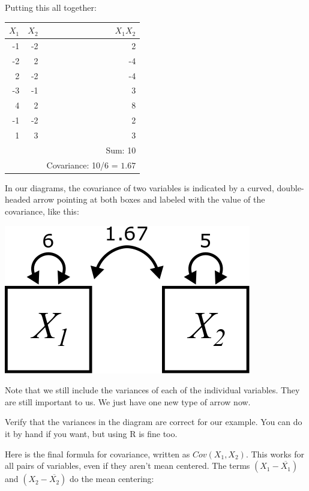 \documentclass[
]{book}
\begin{document}
Putting this all together:

\begin{longtable}[]{@{}rrr@{}}
\toprule
\(X_{1}\) & \(X_{2}\) & \(X_{1}X_{2}\) \\
\midrule
\endhead
-1 & -2 & 2 \\
-2 & 2 & -4 \\
2 & -2 & -4 \\
-3 & -1 & 3 \\
4 & 2 & 8 \\
-1 & -2 & 2 \\
1 & 3 & 3 \\
& & Sum: 10 \\
& & Covariance: 10/6 = \(\boxed{1.67}\) \\
\bottomrule
\end{longtable}

In our diagrams, the covariance of two variables is indicated by a curved, double-headed arrow pointing at both boxes and labeled with the value of the covariance, like this:

\begin{center}\includegraphics{graphics/covariance_labeled} \end{center}

Note that we still include the variances of each of the individual variables. They are still important to us. We just have one new type of arrow now.

Verify that the variances in the diagram are correct for our example. You can do it by hand if you want, but using R is fine too.

Here is the final formula for covariance, written as \(Cov\left(X_{1}, X_{2}\right)\). This works for all pairs of variables, even if they aren't mean centered. The terms \(\left(X_{1} - \overline{X_1}\right)\) and \(\left(X_{2} - \overline{X_2}\right)\) do the mean centering:
\end{document}
